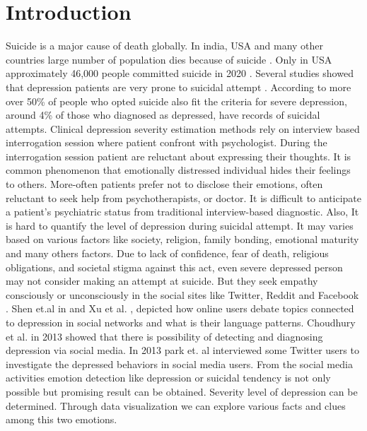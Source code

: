 \documentclass[sn-mathphys,Numbered]{sn-jnl}%
\theoremstyle{thmstyleone}%
\theoremstyle{thmstyletwo}%
\theoremstyle{thmstylethree}%
\begin{document}
\section{Introduction}\label{sec1}
Suicide is a major cause of death globally. In india, USA and many other countries large number of population dies because of suicide \cite{havigerova2019text, singh2022startling}. Only in USA approximately 46,000 people committed suicide in 2020 \cite{singh2022startling}. Several studies showed that depression patients are very prone to suicidal attempt \cite{vuorilehto2006suicidal, mcgirr2007examination, hawton2013risk}. According to \cite{singh2022startling} more over 50\% of people who opted suicide also fit the criteria for severe depression, around 4\% of those who diagnosed as depressed, have records of suicidal attempts. 
Clinical depression severity estimation methods rely on interview based interrogation session where patient confront with psychologist. During the interrogation session patient are reluctant about expressing their thoughts. It is common phenomenon that emotionally distressed individual hides their feelings to others. More-often patients prefer not to disclose their emotions, often reluctant to seek help from psychotherapists, or doctor. It is difficult to anticipate a patient's psychiatric status from traditional interview-based diagnostic. Also, It is hard to quantify the level of depression during suicidal attempt. It may varies based on various factors like society, religion, family bonding, emotional maturity and many others factors. Due to lack of confidence, fear of death, religious obligations, and societal stigma against this act, even severe depressed person may not consider making an attempt at suicide. But they seek empathy consciously or unconsciously in the social sites like Twitter, Reddit and Facebook \cite{chen2018}. Shen et.al in \cite{shen2017depression} and Xu et al. \cite{xu2016contribution}, depicted how online users debate topics connected to depression in social networks and what is their language patterns. Choudhury et al. in 2013 \cite{de2013predicting} showed that there is possibility of detecting and diagnosing depression via social media. In 2013 park et. al \cite{park2013perception} interviewed some Twitter users to investigate the depressed behaviors in social media users. From the social media activities emotion detection like depression or suicidal tendency is not only possible but promising result can be obtained. Severity level of depression can be determined. Through data visualization we can explore various facts and clues among this two emotions. 
\end{document}
